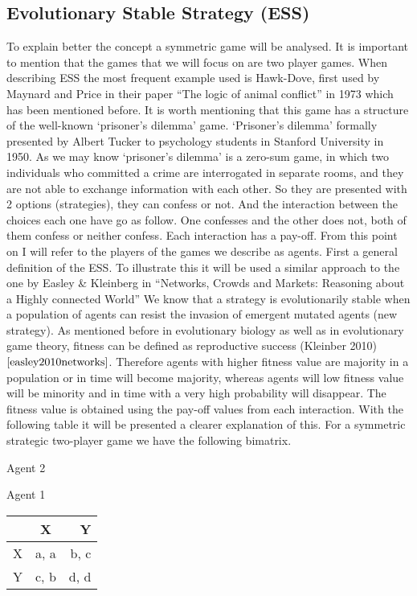 \documentclass{article}
\begin{document}
\subsection{Evolutionary Stable Strategy (ESS)}
To explain better the concept a symmetric game will be analysed. It is important to mention that the games that we will focus on are two player games. 
When describing ESS the most frequent example used is Hawk-Dove, first used by Maynard and Price in their paper ``The logic of animal conflict'' in 1973 which has been mentioned before. It is worth mentioning that this game has a structure of the well-known ‘prisoner’s dilemma’ game. `Prisoner’s dilemma’ formally presented by Albert Tucker to psychology students in Stanford University in 1950. As we may know ‘prisoner’s dilemma’ is a zero-sum game, in which two individuals who committed a crime are interrogated in separate rooms, and they are not able to exchange information with each other. So they are presented with 2 options (strategies), they can confess or not. And the interaction between the choices each one have go as follow. One confesses and the other does not, both of them confess or neither confess. Each interaction has a pay-off. From this point on I will refer to the players of the games we describe as agents.
First a general definition of the ESS. To illustrate this it will be used a similar approach to the one by Easley \& Kleinberg in ``Networks, Crowds and Markets: Reasoning about a Highly connected World''
We know that a strategy is evolutionarily stable when a population of agents can resist the invasion of emergent mutated agents (new strategy). As mentioned before in evolutionary biology as well as in evolutionary game theory, fitness can be defined as reproductive success (Kleinber 2010)$\cite{easley2010networks}$. Therefore agents with higher fitness value are majority in a population or in time will become majority, whereas agents will low fitness value will be minority and in time with a very high probability will disappear. The fitness value is obtained using the pay-off values from each interaction. With the following table it will be presented a clearer explanation of this.
For a symmetric strategic two-player game we have the following bimatrix.
\begin{center}
Agent 2

Agent 1
\begin{tabular}{|l|c|r|}
\hline
 & X & Y\\ 
\hline
X & a, a & b, c\\
\hline
Y & c, b & d, d\\
\hline
\end{tabular}
\end{center}
\end{document}
